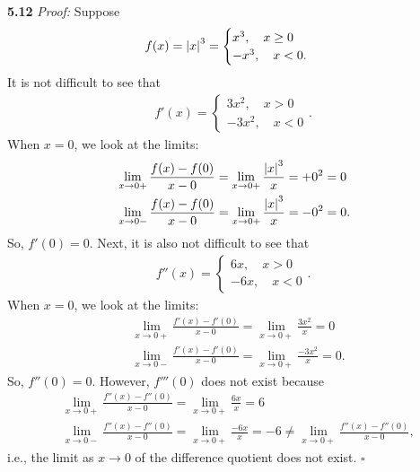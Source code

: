 \documentclass[11pt]{article}
\begin{document}
\noindent \textbf{5.12}
\noindent \textit{Proof:}  Suppose 
\begin{align*}
f(x) = \abs{x}^3 = \begin{cases}
x^3,\quad x \geq 0\\
-x^3, \quad x <0.
\end{cases}
\end{align*} 
It is not difficult to see that 
\begin{align}
f'(x) = \begin{cases}
3x^2, \quad x > 0\\
-3x^2, \quad x < 0
\end{cases}.
\end{align}
When $x=0$, we look at the limits:
\begin{align*}
&\lim_{x \to 0+}\frac{f(x) - f(0)}{x-0} = \lim_{x\to 0+}\frac{\abs{x}^3}{x} = +0^2 = 0\\
&\lim_{x \to 0-}\frac{f(x) - f(0)}{x-0} = \lim_{x\to 0+}\frac{\abs{x}^3}{x} = -0^2 = 0.
\end{align*}
So, $f'(0) = 0$. Next, it is also not difficult to see that 
\begin{align*}
f''(x) = \begin{cases}
6x, \quad x > 0\\
-6x, \quad x < 0
\end{cases}.
\end{align*}
When $x=0$, we look at the limits:
\begin{align*}
&\lim_{x \to 0+}\frac{f'(x) - f'(0)}{x-0} = \lim_{x\to 0+}\frac{3x^2}{x} = 0\\
&\lim_{x \to 0-}\frac{f'(x) - f'(0)}{x-0} = \lim_{x\to 0+}\frac{-3x^2}{x} = 0.
\end{align*}
So, $f''(0) = 0$. However, $f'''(0)$ does not exist because
\begin{align*}
&\lim_{x \to 0+}\frac{f''(x) - f''(0)}{x-0} = \lim_{x\to 0+}\frac{6x}{x} = 6\\
&\lim_{x \to 0-}\frac{f''(x) - f''(0)}{x-0} = \lim_{x\to 0+}\frac{-6x}{x} = -6 \neq \lim_{x \to 0+}\frac{f''(x) - f''(0)}{x-0},
\end{align*}
i.e., the limit as $x\to 0$ of the difference quotient does not exist. \hfill $\square$\\
\end{document}

